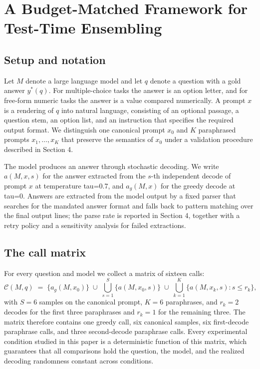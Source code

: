 \documentclass[preprint,12pt]{elsarticle}
\begin{document}
\section{A Budget-Matched Framework for Test-Time Ensembling}


\subsection{Setup and notation}

Let $M$ denote a large language model and let $q$ denote a question with a gold answer $y^*(q)$. For multiple-choice tasks the answer is an option letter, and for free-form numeric tasks the answer is a value compared numerically. A prompt $x$ is a rendering of $q$ into natural language, consisting of an optional passage, a question stem, an option list, and an instruction that specifies the required output format. We distinguish one canonical prompt $x_0$ and $K$ paraphrased prompts $x_1, \dots, x_K$ that preserve the semantics of $x_0$ under a validation procedure described in Section 4.

The model produces an answer through stochastic decoding. We write $a(M, x, s)$ for the answer extracted from the $s$-th independent decode of prompt $x$ at temperature tau=0.7, and $a_g(M, x)$ for the greedy decode at tau=0. Answers are extracted from the model output by a fixed parser that searches for the mandated answer format and falls back to pattern matching over the final output lines; the parse rate is reported in Section 4, together with a retry policy and a sensitivity analysis for failed extractions.

\subsection{The call matrix}

For every question and model we collect a matrix of sixteen calls:
\begin{equation}
\mathcal{C}(M, q) \;=\; \bigl\{ a_g(M, x_0) \bigr\} \;\cup\; \bigcup_{s=1}^{S} \bigl\{ a(M, x_0, s) \bigr\} \;\cup\; \bigcup_{k=1}^{K} \bigl\{ a(M, x_k, s) : s \le r_k \bigr\},

\end{equation}
with $S = 6$ samples on the canonical prompt, $K = 6$ paraphrases, and $r_k = 2$ decodes for the first three paraphrases and $r_k = 1$ for the remaining three. The matrix therefore contains one greedy call, six canonical samples, six first-decode paraphrase calls, and three second-decode paraphrase calls. Every experimental condition studied in this paper is a deterministic function of this matrix, which guarantees that all comparisons hold the question, the model, and the realized decoding randomness constant across conditions.
\end{document}

